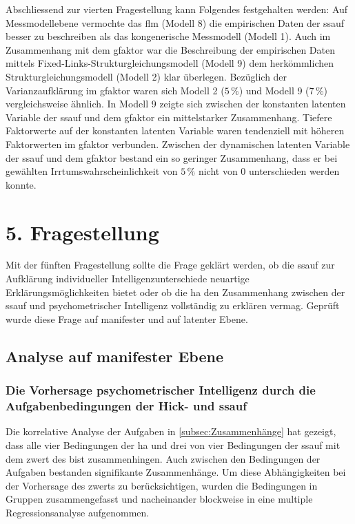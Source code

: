 \documentclass[11pt, twoside, a4paper]{book}		%
\begin{document}
Abschliessend zur vierten Fragestellung kann Folgendes festgehalten werden: Auf Messmodellebene vermochte das \gls{flm} (Modell 8) die empirischen Daten der \gls{ssauf} besser zu beschreiben als das kongenerische Messmodell (Modell 1). Auch im Zusammenhang mit dem \gls{gfaktor} war die Beschreibung der empirischen Daten mittels Fixed-Links-Strukturgleichungsmodell (Modell 9) dem herkömmlichen Strukturgleichungsmodell (Modell 2) klar überlegen. Bezüglich der Varianzaufklärung im \gls{gfaktor} waren sich Modell 2 ($5\,\%$) und Modell 9 ($7\,\%$)  vergleichsweise ähnlich. 
In Modell 9 zeigte sich zwischen der konstanten latenten Variable der \gls{ssauf} und dem \gls{gfaktor} ein mittelstarker Zusammenhang. Tiefere Faktorwerte auf der konstanten latenten Variable waren tendenziell mit höheren Faktorwerten im \gls{gfaktor} verbunden.
Zwischen der dynamischen latenten Variable der \gls{ssauf} und dem \gls{gfaktor} bestand ein so geringer Zusammenhang, dass er bei gewählten Irrtumswahrscheinlichkeit von $5\,\%$ nicht von 0 unterschieden werden konnte. 














\section{5. Fragestellung}

Mit der fünften Fragestellung sollte die Frage geklärt werden, ob die \gls{ssauf} zur Aufklärung individueller Intelligenzunterschiede neuartige Erklärungsmöglichkeiten bietet oder ob die \gls{ha} den Zusammenhang zwischen der \gls{ssauf} und psychometrischer Intelligenz vollständig zu erklären vermag. Geprüft wurde diese Frage auf manifester und auf latenter Ebene.

\subsection{Analyse auf manifester Ebene}

\subsubsection*{Die Vorhersage psychometrischer Intelligenz durch die Aufgabenbedingungen der Hick- und \gls{ssauf}}

Die korrelative Analyse der Aufgaben in \autoref{subsec:Zusammenhänge}  hat gezeigt, dass alle vier Bedingungen der \gls{ha} und drei von vier Bedingungen der \gls{ssauf} mit dem \gls{zwert} des \gls{bist} zusammenhingen. Auch zwischen den Bedingungen der Aufgaben bestanden signifikante Zusammenhänge. 
Um diese Abhängigkeiten bei der Vorhersage des \gls{zwert}s zu berücksichtigen, wurden die Bedingungen in Gruppen zusammengefasst und nacheinander blockweise in eine multiple Regressionsanalyse aufgenommen.
\end{document}
